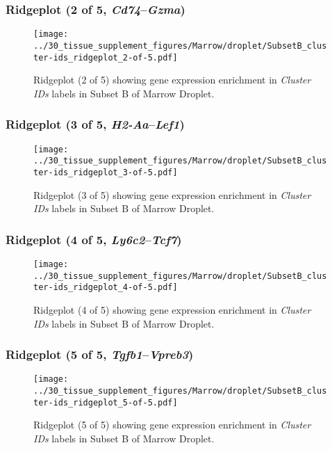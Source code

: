 \subsubsection{Ridgeplot (2 of 5, \emph{Cd74}--\emph{Gzma})}
\begin{figure}[h]
\centering
\texttt{[image: ../30\_tissue\_supplement\_figures/Marrow/droplet/SubsetB\_cluster-ids\_ridgeplot\_2-of-5.pdf]}

\caption{ Ridgeplot (2 of 5)  showing gene expression enrichment in \emph{Cluster IDs} labels in Subset B of Marrow Droplet. }
\end{figure}


\clearpage

\subsubsection{Ridgeplot (3 of 5, \emph{H2-Aa}--\emph{Lef1})}
\begin{figure}[h]
\centering
\texttt{[image: ../30\_tissue\_supplement\_figures/Marrow/droplet/SubsetB\_cluster-ids\_ridgeplot\_3-of-5.pdf]}

\caption{ Ridgeplot (3 of 5)  showing gene expression enrichment in \emph{Cluster IDs} labels in Subset B of Marrow Droplet. }
\end{figure}


\clearpage

\subsubsection{Ridgeplot (4 of 5, \emph{Ly6c2}--\emph{Tcf7})}
\begin{figure}[h]
\centering
\texttt{[image: ../30\_tissue\_supplement\_figures/Marrow/droplet/SubsetB\_cluster-ids\_ridgeplot\_4-of-5.pdf]}

\caption{ Ridgeplot (4 of 5)  showing gene expression enrichment in \emph{Cluster IDs} labels in Subset B of Marrow Droplet. }
\end{figure}


\clearpage

\subsubsection{Ridgeplot (5 of 5, \emph{Tgfb1}--\emph{Vpreb3})}
\begin{figure}[h]
\centering
\texttt{[image: ../30\_tissue\_supplement\_figures/Marrow/droplet/SubsetB\_cluster-ids\_ridgeplot\_5-of-5.pdf]}

\caption{ Ridgeplot (5 of 5)  showing gene expression enrichment in \emph{Cluster IDs} labels in Subset B of Marrow Droplet. }
\end{figure}


